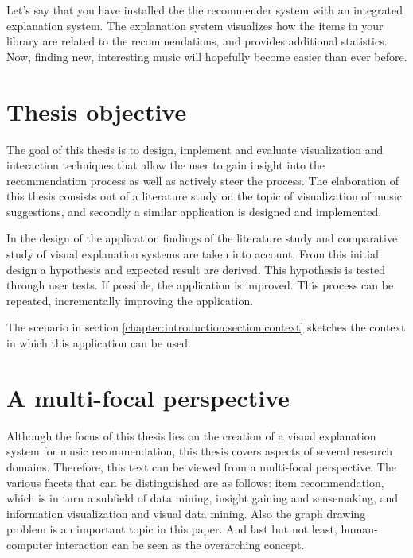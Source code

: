 Let's say that you have installed the the recommender system with an integrated explanation system. The explanation system visualizes how the items in your library are related to the recommendations, and provides additional statistics. Now, finding new, interesting music will hopefully become easier than ever before.

\section{Thesis objective}\label{chapter:introduction:section:objective}

The goal of this thesis is to design, implement and evaluate visualization and interaction techniques that allow the user to gain insight into the recommendation process as well as actively steer the process. The elaboration of this thesis consists out of a literature study on the topic of visualization of music suggestions, and secondly a similar application is designed and implemented\cite{kuleuven:2008:t313}.

In the design of the application findings of the literature study and comparative study of visual explanation systems are taken into account. From this initial design a hypothesis and expected result are derived. This hypothesis is tested through user tests. If possible, the application is improved. This process can be repeated, incrementally improving the application.

The scenario in section \ref{chapter:introduction:section:context} sketches the context in which this application can be used.


\section{A multi-focal perspective}\label{chapter:introduction:section:perspective}

Although the focus of this thesis lies on the creation of a visual explanation system for music recommendation, this thesis covers aspects of several research domains. Therefore, this text can be viewed from a multi-focal perspective. The various facets that can be distinguished are as follows: item recommendation, which is in turn a subfield of data mining, insight gaining and sensemaking, and information visualization and visual data mining. Also the graph drawing problem is an important topic in this paper. And last but not least, human-computer interaction can be seen as the overarching concept.


